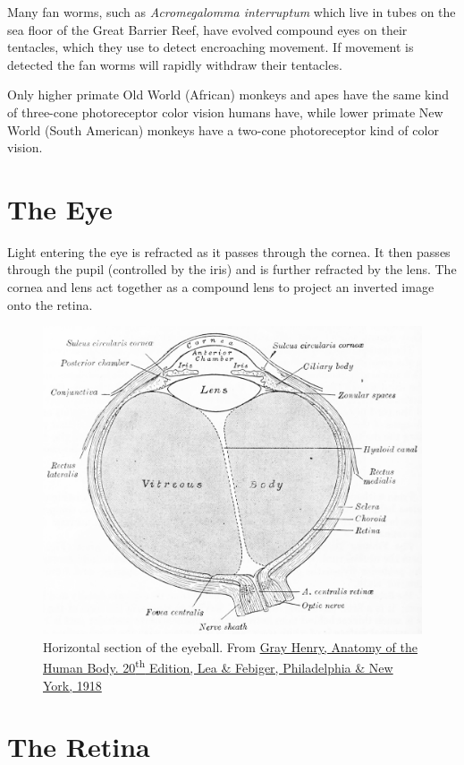 Many fan worms, such as \emph{Acromegalomma interruptum} which live in tubes on the sea floor of the Great Barrier Reef, have evolved compound eyes on their tentacles, which they use to detect encroaching movement. If movement is detected the fan worms will rapidly withdraw their tentacles.

Only higher primate Old World (African) monkeys and apes have the same kind of three-cone photoreceptor color vision humans have, while lower primate New World (South American) monkeys have a two-cone photoreceptor kind of color vision.

\hypertarget{the-eye}{%
\section{The Eye}\label{the-eye}}

Light entering the eye is refracted as it passes through the cornea. It then passes through the pupil (controlled by the iris) and is further refracted by the lens. The cornea and lens act together as a compound lens to project an inverted image onto the retina.



\begin{figure}

{\centering \includegraphics[width=0.7\linewidth]{./figures/visual/anatomyofhumanbo1918gray_1008} 

}

\caption{Horizontal section of the eyeball. From \href{https://archive.org/details/anatomyofhumanbo1918gray/page/n6/mode/2up}{Gray Henry, Anatomy of the Human Body. 20\textsuperscript{th} Edition, Lea \& Febiger, Philadelphia \& New York, 1918}}\label{fig:eye}
\end{figure}

\hypertarget{the-retina}{%
\section{The Retina}\label{the-retina}}

